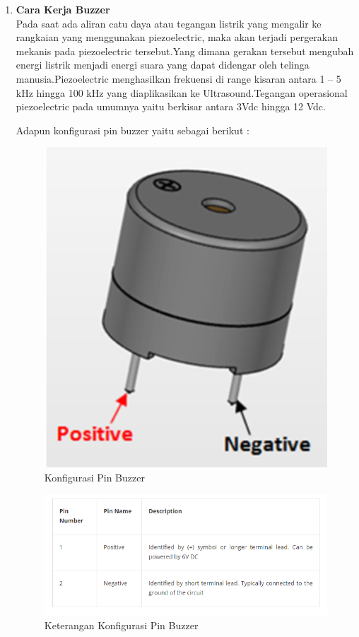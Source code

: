 \begin{enumerate}
\item \textbf{Cara Kerja Buzzer }\\
Pada saat ada aliran catu daya atau tegangan listrik yang mengalir ke rangkaian yang menggunakan piezoelectric, maka akan terjadi pergerakan mekanis pada piezoelectric tersebut.Yang dimana gerakan tersebut mengubah energi listrik menjadi energi suara yang dapat didengar oleh telinga manusia.Piezoelectric menghasilkan frekuensi di range kisaran antara 1 – 5 kHz hingga 100 kHz yang diaplikasikan ke Ultrasound.Tegangan operasional piezoelectric pada umumnya yaitu berkisar antara 3Vdc hingga 12 Vdc.

Adapun konfigurasi pin buzzer yaitu sebagai berikut :
\begin{figure}[H]
\centering
\includegraphics[width=1\textwidth]{figures/buzzer2.png}
\caption{Konfigurasi Pin Buzzer}
\label{print}
\end{figure}

\begin{figure}[H]
\centering
\includegraphics[width=1\textwidth]{figures/buzzer3.png}
\caption{Keterangan Konfigurasi Pin Buzzer}
\label{print}
\end{figure}


\end{enumerate}
